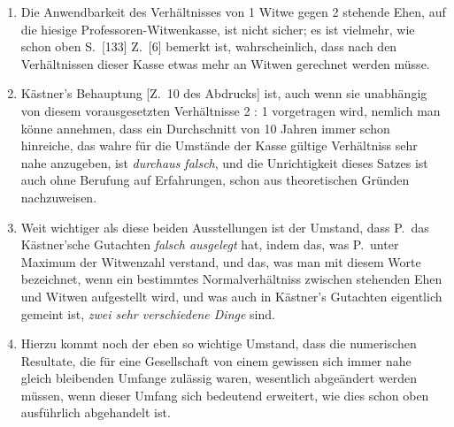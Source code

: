 \documentclass[12pt,a4paper]{article}
\begin{document}
\begin{enumerate}
\item Die Anwendbarkeit des Verh\"altnisses von 1 Witwe gegen 2 stehende Ehen, auf die hiesige Professoren-Witwenkasse, ist nicht sicher; es ist vielmehr, wie schon oben S.\ [133] Z.\ [6] bemerkt ist, wahrscheinlich, dass nach den Verh\"altnissen dieser Kasse etwas mehr an Witwen gerechnet werden m\"usse.

\item K\"astner's Behauptung [Z.\ 10 des Abdrucks] ist, auch wenn sie unabh\"angig von diesem vorausgesetzten Verh\"altnisse 2 : 1 vorgetragen wird, nemlich man k\"onne annehmen, dass ein Durchschnitt von 10 Jahren immer schon hinreiche, das wahre f\"ur die Umst\"ande der Kasse g\"ultige Verh\"altniss sehr nahe anzugeben, ist \textit{durchaus falsch}, und die Unrichtigkeit dieses Satzes ist auch ohne Berufung auf Erfahrungen, schon aus theoretischen Gr\"unden nachzuweisen.

\item Weit wichtiger als diese beiden Ausstellungen ist der Umstand, dass P.\ das K\"astner'sche Gutachten \textit{falsch ausgelegt} hat, indem das, was P.\ unter Maximum der Witwenzahl verstand, und das, was man mit diesem Worte bezeichnet, wenn ein bestimmtes Normalverh\"altniss zwischen stehenden Ehen und Witwen aufgestellt wird, und was auch in K\"astner's Gutachten eigentlich gemeint ist, \textit{zwei sehr verschiedene Dinge} sind.

\item Hierzu kommt noch der eben so wichtige Umstand, dass die numerischen Resultate, die f\"ur eine Gesellschaft von einem gewissen sich immer nahe gleich bleibenden Umfange zul\"assig waren, wesentlich abge\"andert werden m\"ussen, wenn dieser Umfang sich bedeutend erweitert, wie dies schon oben ausf\"uhrlich abgehandelt ist.
\end{enumerate}
\end{document}
